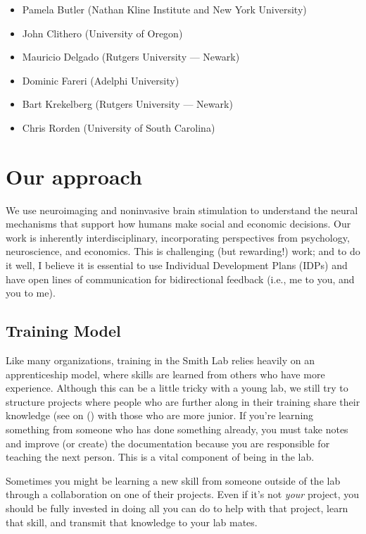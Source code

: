 \documentclass[letterpaper,11pt,oneside]{memoir}
\begin{document}
\begin{itemize}[noitemsep,nolistsep]
\item Pamela Butler (Nathan Kline Institute and New York University)
\item John Clithero (University of Oregon)
\item Mauricio Delgado (Rutgers University --- Newark)
\item Dominic Fareri (Adelphi University)
\item Bart Krekelberg (Rutgers University --- Newark)
\item Chris Rorden (University of South Carolina) 
\end{itemize}


\section{Our approach}
We use neuroimaging and noninvasive brain stimulation to understand the neural mechanisms that support how humans make social and economic decisions. Our work is inherently interdisciplinary, incorporating perspectives from psychology, neuroscience, and economics. This is challenging (but rewarding!) work; and to do it well, I believe it is essential to use Individual Development Plans (IDPs) and have open lines of communication for bidirectional feedback (i.e., me to you, and you to me). 

\subsection{Training Model}
\label{sec:training}

Like many organizations, training in the Smith Lab relies heavily on an apprenticeship model, where skills are learned from others who have more experience. Although this can be a little tricky with a young lab, we still try to structure projects where people who are further along in their training share their knowledge (see  on () with those who are more junior. If you're learning something from someone who has done something already, you must take notes and improve (or create) the documentation because you are responsible for teaching the next person. This is a vital component of being in the lab. 

Sometimes you might be learning a new skill from someone outside of the lab through a collaboration on one of their projects. Even if it's not \textit{your} project, you should be fully invested in doing all you can do to help with that project, learn that skill, and transmit that knowledge to your lab mates. 
\end{document}
